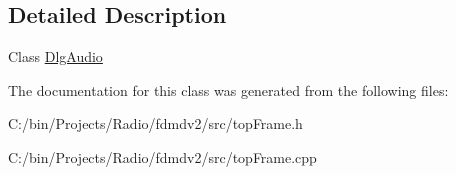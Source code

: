 \subsection{Detailed Description}
Class \hyperlink{class_dlg_audio}{Dlg\-Audio} 

The documentation for this class was generated from the following files\-:\begin{DoxyCompactItemize}
\item 
C\-:/bin/\-Projects/\-Radio/fdmdv2/src/top\-Frame.\-h\item 
C\-:/bin/\-Projects/\-Radio/fdmdv2/src/top\-Frame.\-cpp\end{DoxyCompactItemize}
